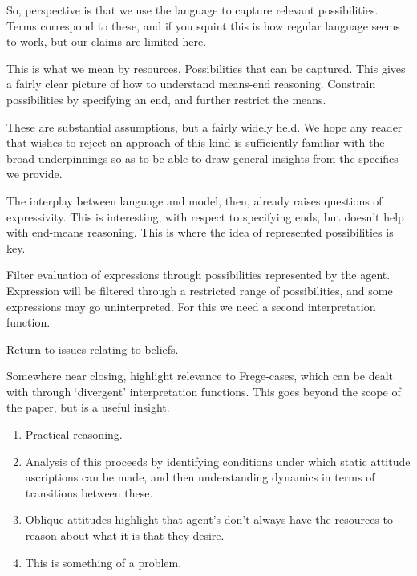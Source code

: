 \documentclass[10pt]{article}
\begin{document}
So, perspective is that we use the language to capture relevant possibilities.
Terms correspond to these, and if you squint this is how regular language seems to work, but our claims are limited here.

This is what we mean by resources.
Possibilities that can be captured.
This gives a fairly clear picture of how to understand means-end reasoning.
Constrain possibilities by specifying an end, and further restrict the means.

These are substantial assumptions, but a fairly widely held.
We hope any reader that wishes to reject an approach of this kind is sufficiently familiar with the broad underpinnings so as to be able to draw general insights from the specifics we provide.

The interplay between language and model, then, already raises questions of expressivity.
This is interesting, with respect to specifying ends, but doesn't help with end-means reasoning.
This is where the idea of represented possibilities is key.

Filter evaluation of expressions through possibilities represented by the agent.
Expression will be filtered through a restricted range of possibilities, and some expressions may go uninterpreted.
For this we need a second interpretation function.

Return to issues relating to beliefs.








Somewhere near closing, highlight relevance to Frege-cases, which can be dealt with through `divergent' interpretation functions.
This goes beyond the scope of the paper, but is a useful insight.





\newpage

\begin{enumerate}
\item Practical reasoning.
\item Analysis of this proceeds by identifying conditions under which static attitude ascriptions can be made, and then understanding dynamics in terms of transitions between these.
\item Oblique attitudes highlight that agent's don't always have the resources to reason about what it is that they desire.
\item This is something of a problem.
\end{enumerate}
\end{document}

